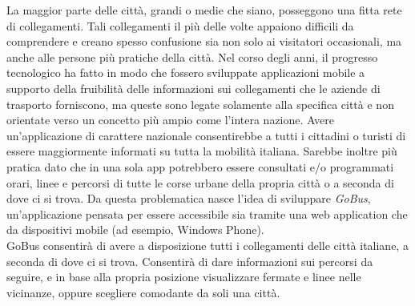 La maggior parte delle citt\`{a}, grandi o medie che siano, posseggono una fitta rete di collegamenti. Tali collegamenti il più delle volte appaiono difficili da comprendere e creano spesso confusione sia non solo ai visitatori occasionali, ma anche alle persone più pratiche della citt\`{a}. Nel corso degli anni, il progresso tecnologico ha fatto in modo che fossero sviluppate applicazioni mobile a supporto della fruibilit\`{a} delle informazioni sui collegamenti che le aziende di trasporto forniscono, ma queste sono legate solamente alla specifica città e non orientate verso un concetto più ampio come l’intera nazione. Avere un’applicazione di carattere nazionale consentirebbe a tutti i cittadini o turisti di essere maggiormente informati su tutta la mobilit\`{a} italiana. Sarebbe inoltre più pratica dato che in una sola app potrebbero essere consultati e/o programmati orari, linee e percorsi di tutte le corse urbane della propria città o a seconda di dove ci si trova. Da questa problematica nasce l’idea di sviluppare \emph{GoBus}, un’applicazione pensata per essere accessibile sia tramite una web application che da dispositivi mobile (ad esempio, Windows Phone).\\

GoBus consentirà di avere a disposizione tutti i collegamenti delle citt\`{a} italiane, a seconda di dove ci si trova. Consentirà di dare informazioni sui percorsi da seguire, e in base alla propria posizione visualizzare fermate e linee nelle vicinanze, oppure scegliere comodante da soli una citt\`{a}.